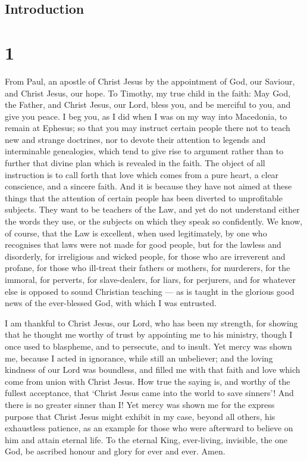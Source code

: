\hypertarget{introduction}{%
\subsection{Introduction}\label{introduction}}

\hypertarget{section}{%
\section{1}\label{section}}

 From Paul, an apostle of Christ Jesus by the appointment of
God, our Saviour, and Christ Jesus, our hope.  To Timothy,
my true child in the faith: May God, the Father, and Christ Jesus, our
Lord, bless you, and be merciful to you, and give you peace.
 I beg you, as I did when I was on my way into Macedonia, to
remain at Ephesus; so that you may instruct certain people there not to
teach new and strange doctrines,  nor to devote their
attention to legends and interminable genealogies, which tend to give
rise to argument rather than to further that divine plan which is
revealed in the faith.  The object of all instruction is to
call forth that love which comes from a pure heart, a clear conscience,
and a sincere faith.  And it is because they have not aimed
at these things that the attention of certain people has been diverted
to unprofitable subjects.  They want to be teachers of the
Law, and yet do not understand either the words they use, or the
subjects on which they speak so confidently.  We know, of
course, that the Law is excellent, when used legitimately, 
by one who recognises that laws were not made for good people, but for
the lawless and disorderly, for irreligious and wicked people, for those
who are irreverent and profane, for those who ill-treat their fathers or
mothers, for murderers,  for the immoral, for perverts, for
slave-dealers, for liars, for perjurers, and for whatever else is
opposed to sound Christian teaching ---  as is taught in
the glorious good news of the ever-blessed God, with which I was
entrusted.

 I am thankful to Christ Jesus, our Lord, who has been my
strength, for showing that he thought me worthy of trust by appointing
me to his ministry,  though I once used to blaspheme, and
to persecute, and to insult. Yet mercy was shown me, because I acted in
ignorance, while still an unbeliever;  and the loving
kindness of our Lord was boundless, and filled me with that faith and
love which come from union with Christ Jesus.  How true the
saying is, and worthy of the fullest acceptance, that `Christ Jesus came
into the world to save sinners'! And there is no greater sinner than I!
 Yet mercy was shown me for the express purpose that Christ
Jesus might exhibit in my case, beyond all others, his exhaustless
patience, as an example for those who were afterward to believe on him
and attain eternal life.  To the eternal King, ever-living,
invisible, the one God, be ascribed honour and glory for ever and ever.
Amen.

